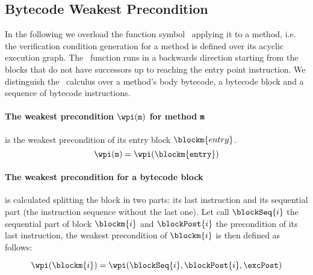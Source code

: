 

\subsection{Bytecode Weakest Precondition}\label{wpGraph}

In the following we overload the function symbol \wpi \ applying it to a method, i.e. the verification condition generation for a method is defined over its acyclic execution graph.
The \wpi \ function runs in a backwards direction starting from the blocks that do not have successors up to reaching the entry point
 instruction. We distinguish the \wpi \ calculus over  a method's body bytecode, a bytecode block and a sequence of bytecode instructions.

\paragraph{The weakest precondition $\wpi(\tt{m})$ for method \texttt{m}} is the weakest precondition of its entry block $\blockm{entry}$. 
 $$\wpi(\tt{m}) = \wpi(\blockm{entry})$$%
%

%


\paragraph{The weakest precondition for a bytecode block} is calculated splitting the block in two parts: its last instruction and its sequential part (the instruction sequence without the last one).
Let call $\blockSeq{i}$ the sequential part of block $\blockm{i}$ and $\blockPost{i}$ the precondition of its last instruction, the weakest precondition of $\blockm{i}$ is then defined as follows:

$$ \wpi(\blockm{i}) = \wpi( \blockSeq{i}, \blockPost{i}, \excPost ) $$

